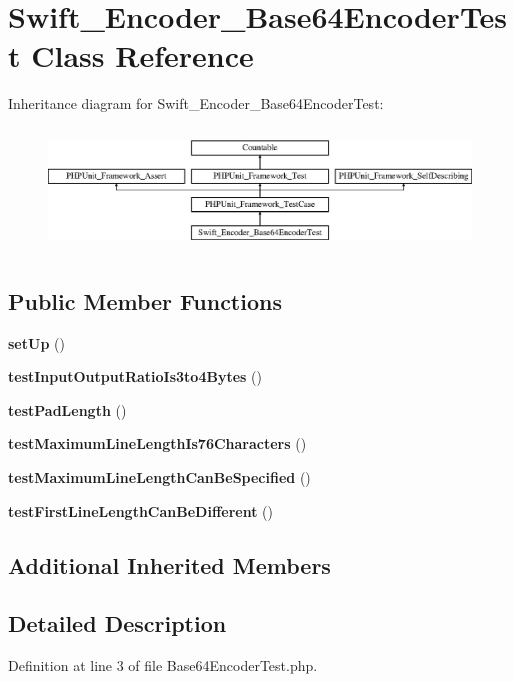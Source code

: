 \section{Swift\+\_\+\+Encoder\+\_\+\+Base64\+Encoder\+Test Class Reference}
\label{class_swift___encoder___base64_encoder_test}
Inheritance diagram for Swift\+\_\+\+Encoder\+\_\+\+Base64\+Encoder\+Test\+:\begin{figure}[H]
\begin{center}
\leavevmode
\includegraphics[height=3.303835cm]{class_swift___encoder___base64_encoder_test}
\end{center}
\end{figure}
\subsection*{Public Member Functions}
\begin{DoxyCompactItemize}
\item 
{\bf set\+Up} ()
\item 
{\bf test\+Input\+Output\+Ratio\+Is3to4\+Bytes} ()
\item 
{\bf test\+Pad\+Length} ()
\item 
{\bf test\+Maximum\+Line\+Length\+Is76\+Characters} ()
\item 
{\bf test\+Maximum\+Line\+Length\+Can\+Be\+Specified} ()
\item 
{\bf test\+First\+Line\+Length\+Can\+Be\+Different} ()
\end{DoxyCompactItemize}
\subsection*{Additional Inherited Members}


\subsection{Detailed Description}


Definition at line 3 of file Base64\+Encoder\+Test.\+php.



